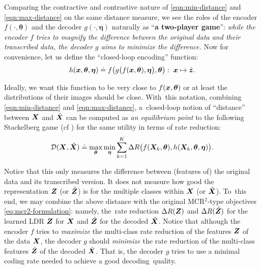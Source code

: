 \documentclass[\toplevelprefix/book-main.tex]{subfiles}
\begin{document}
Comparing the contractive and contrastive nature of \eqref{eqn:min-distance} and \eqref{eqn:max-distance} on the same distance measure, we see the roles of the encoder $f(\cdot, \bm \theta)$ and the decoder $g(\cdot, \bm \eta)$ naturally as ``{\bf a  two-player game}'': {\em while the encoder $f$ tries to magnify the difference between the original data and their transcribed data, the decoder $g$ aims to minimize the difference.} Now for convenience, let us define the ``closed-loop encoding'' function:
\begin{equation}
    h(\bm{x}, \bm \theta,\bm \eta) \doteq f\big(g\big(f(\bm{x}, \bm \theta), \bm \eta\big), \bm \theta\big): \; \bm{x} \mapsto \hat {\bm{z}}.
\end{equation}

Ideally, we want this function to be very close to $f(\bm{x}, \bm \theta)$ or at least the distributions of their images should be close. With~this notation, combining \eqref{eqn:min-distance} and \eqref{eqn:max-distance}, a~closed-loop notion of ``distance'' between $\bm{X}$ and $\hat {\bm{X}}$ can be computed as {\em an equilibrium point} to the following Stackelberg game (cf ) for the same utility in terms of rate reduction:%
\begin{equation}
\mathcal{D}(\bm{X}, \hat {\bm{X}}) \doteq  \max_{\bm \theta} \min_{\bm \eta} \sum_{k=1}^K \Delta R\big(f(\bm{X}_k,\bm \theta), h(\bm{X}_k,\bm \theta,\bm \eta)\big).
    \label{eq:MCR2-GAN-pair}
\end{equation}

Notice that this only measures the difference between (features of) the original data and its transcribed version. It does not measure how good the representation $\bm{Z}$ (or $\hat {\bm{Z}}$) is for the multiple classes within $\bm{X}$ (or $\hat {\bm{X}}$). To~this end, we may combine the above distance with the original MCR$^2$-type objectives  \eqref{eq:mcr2-formulation}: namely, the~rate reduction $\Delta R(\bm{Z})$ and $\Delta R(\hat {\bm{Z}})$ for the learned LDR $\bm{Z}$ for $\bm{X}$ and $\hat {\bm{Z}}$ for the decoded $\hat {\bm{X}}$. Notice that although the encoder $f$ tries to {\em maximize} the multi-class rate reduction of the features $\bm{Z}$ of the data $\bm{X}$,  the decoder $g$ should {\em minimize} the rate reduction of the multi-class  features $\hat {\bm{Z}}$ of the decoded $\hat {\bm{X}}$. That is, the decoder $g$ tries to use a minimal  coding rate needed to achieve a good decoding~quality. 
\end{document}
